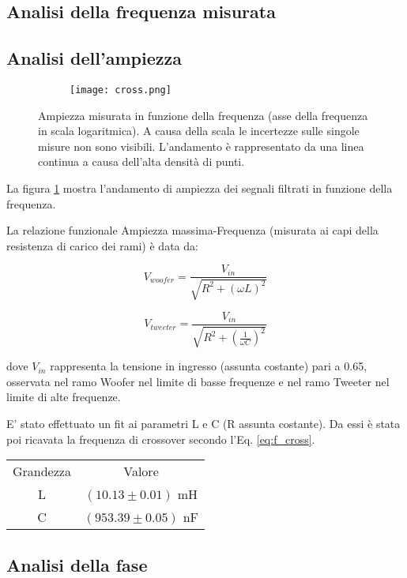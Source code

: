 \documentclass[../Relazione_circuiti]{subfiles}
\begin{document}
\subsection{Analisi della frequenza misurata}

\subsection{Analisi dell'ampiezza}

\begin{figure}[H]
\centering

\begin{subfigure}{=0.7\textwidth}

\texttt{[image: cross.png]}

\end{subfigure}

\caption{Ampiezza misurata in funzione della frequenza (asse della frequenza in scala logaritmica). A causa della scala le incertezze sulle singole misure non sono visibili. L'andamento è rappresentato da una linea continua a causa dell'alta densità di punti.}
\label{fig: cross_amplitude}

\end{figure}

La figura \ref{fig: cross_amplitude} mostra l'andamento di ampiezza dei segnali filtrati in funzione della frequenza. 

La relazione funzionale Ampiezza massima-Frequenza (misurata ai capi della resistenza di carico dei rami) è data da:

\begin{equation}
V_{woofer} = \frac{V_{in}}{\sqrt{R^2+(\omega L)^2}}
\end{equation}

\begin{equation}
V_{tweeter} = \frac{V_{in}}{\sqrt{R^2+(\frac{1}{\omega C})^2}}
\end{equation}

dove $V_{in}$ rappresenta la tensione in ingresso (assunta costante) pari a 0.65, osservata nel ramo Woofer nel limite di basse frequenze e nel ramo Tweeter nel limite di alte frequenze.

E' stato effettuato un fit ai parametri L e C (R assunta costante). Da essi è stata poi ricavata la frequenza di crossover secondo l'Eq. \ref{eq:f_cross}. 

\begin{tabular}{c | c }

Grandezza & Valore \\

L & $(10.13 \pm 0.01)$ mH \\
C & $(953.39 \pm 0.05)$ nF

\end{tabular}

\subsection{Analisi della fase}
\end{document}

